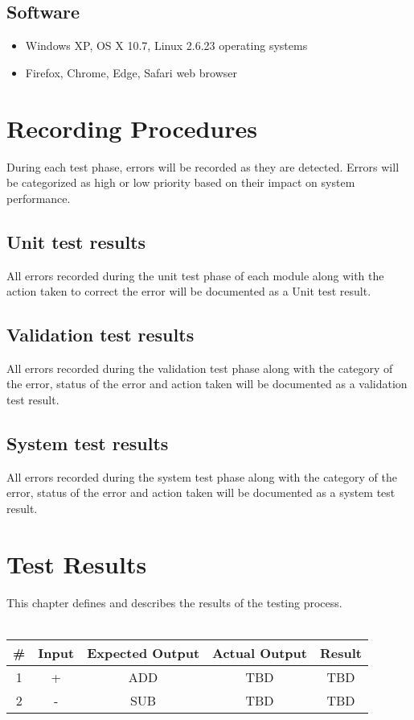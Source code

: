 \documentclass{scrreprt}
\begin{document}
	\section{Software}
	\begin{itemize}
		\item Windows XP, OS X 10.7, Linux 2.6.23 operating systems
		\item Firefox, Chrome, Edge, Safari web browser
	\end{itemize}

	{\let\clearpage\relax \chapter{Recording Procedures}}
	During each test phase, errors will be recorded as they are detected. Errors will be categorized as high or low priority based on their impact on system performance.
	
	\section{Unit test results}
	All errors recorded during the unit test phase of each module along with the action taken to correct the error will be documented as a Unit test result.

	\section{Validation test results}
	All errors recorded during the validation test phase along with the category of the error, status of the error and action taken will be documented as a validation test result.
	
	\section{System test results}
	All errors recorded during the system test phase along with the category of the error, status of the error and action taken will be documented as a system test result.
	
	

	{\let\clearpage\relax \chapter{Test Results}}
	This chapter defines and describes the results of the testing process.\\\\
	\begin{tabular}{|c|c|c|c|c|}
		\hline
		\# & Input & Expected Output & Actual Output & Result \\ \hline
		1 & + & ADD & TBD & TBD \\ \hline
		2 & - & SUB & TBD & TBD \\ \hline
		
	\end{tabular}
\end{document}
